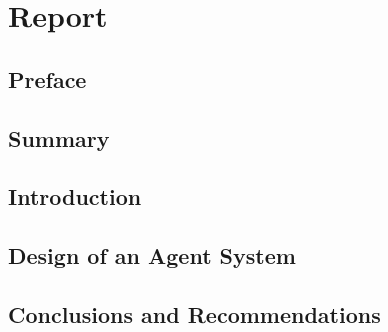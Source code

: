 \part{Report}

\chapter*{Preface}



\chapter*{Summary}

\chapter{Introduction}





\chapter{Design of an Agent System}

\chapter{Conclusions and Recommendations}